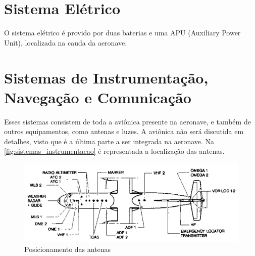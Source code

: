 \section{Sistema Elétrico}

O sistema elétrico é provido por duas baterias e uma APU (Auxiliary Power Unit), localizada na cauda da aeronave.

\section{Sistemas de Instrumentação, Navegação e Comunicação}

Esses sistemas consistem de toda a aviônica presente na aeronave, e também de outros equipamentos, como antenas e luzes.
A aviônica não será discutida em detalhes, visto que é a última parte a ser integrada na aeronave.
Na \autoref{fig:sistemas_instrumentacao} é representada a localização das antenas.

\begin{figure}
\centering
\includegraphics[width=\textwidth]{images/parte3/sistemas_instrumentacao.png}
\caption{Posicionamento das antenas}
\label{fig:sistemas_instrumentacao}
\end{figure}
